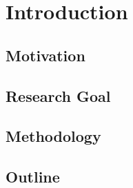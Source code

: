 \chapter{Introduction}

\section{Motivation}

\section{Research Goal}

\section{Methodology}

\section{Outline}